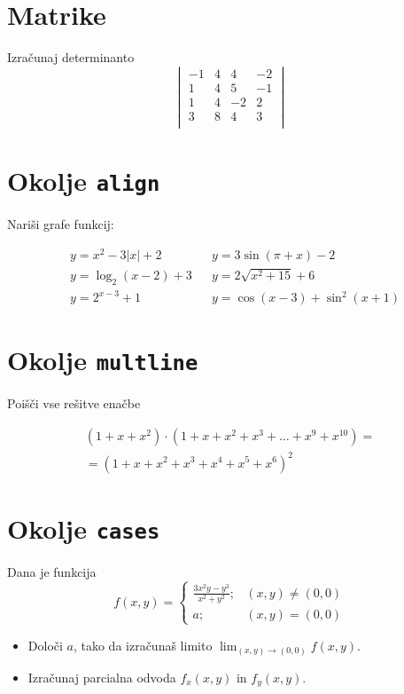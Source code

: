 \documentclass[a4paper,12pt]{article}
\begin{document}
\section*{Matrike}
Izračunaj determinanto
\[
\begin{vmatrix}
	 -1 & 4 & 4 & -2 \\
    1 & 4 & 5 & -1 \\
    1 & 4 & -2 & 2 \\
    3 & 8 & 4 & 3 \\
\end{vmatrix}
\]

\section*{Okolje \texttt{align}}
Nariši grafe funkcij:

\begin{align*}
&y = x^2 - 3|x| + 2  &  &y = 3 \sin(\pi+x) - 2 \\
&y = \log_2(x-2) + 3  &  &y = 2 \sqrt{x^2+15} + 6 \\
&y = 2^{x-3} + 1  &   &y = \cos(x-3) + \sin^2(x+1)
\end{align*}


\section*{Okolje \texttt{multline}}
Poišči vse rešitve enačbe

\begin{multline*}
(1+x+x^2) \cdot (1+x+x^2+x^3+\ldots+x^9+x^{10}) =\\
=(1+x+x^2+x^3+x^4+x^5+x^6)^2
\end{multline*}


\section*{Okolje \texttt{cases}}
Dana je funkcija
\[
    f(x,y)= \begin{cases}
      \frac{3x^2y-y^3}{x^2+y^2}; &  (x,y)\neq(0,0)\\
      a; & (x,y)=(0,0)
    \end{cases}
\]
\begin{itemize}
\item Določi \(a\), tako da izračunaš limito \( \lim_{(x,y)\to(0,0)} f(x,y) \).
\item Izračunaj parcialna odvoda \(f_x(x,y)\) in \(f_y(x,y)\).
\end{itemize}
\end{document}
